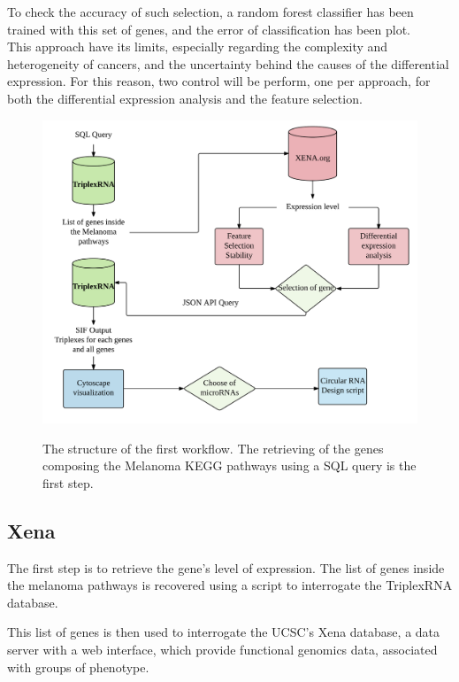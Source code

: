\documentclass[a4paper,12pt]{report}
\begin{document}
To check the accuracy of such selection, a random forest classifier \cite{springer} has been trained with this set of genes, and the error of classification has been plot.\\

This approach have its limits, especially regarding the complexity and heterogeneity of cancers\cite{TGCA, complexity}, and the uncertainty behind the causes of the differential expression. For this reason, two control will be perform, one per approach, for both the differential expression analysis and the feature selection.


\begin{figure}[H]
	\centering
	{\includegraphics[width=1\textwidth]{Workflow1.png}}
	\caption{The structure of the first workflow. The retrieving of the genes composing the Melanoma KEGG pathways using a SQL query is the first step.}
\end{figure}

\subsection{Xena}

The first step is to retrieve the gene's level of expression. The list of genes inside the melanoma pathways is recovered using a script to interrogate the TriplexRNA database.

This list of genes is then used to interrogate the UCSC's Xena database\cite{Xena}, a data server with a web interface, which provide functional genomics data, associated with groups of phenotype.\\
\end{document}
